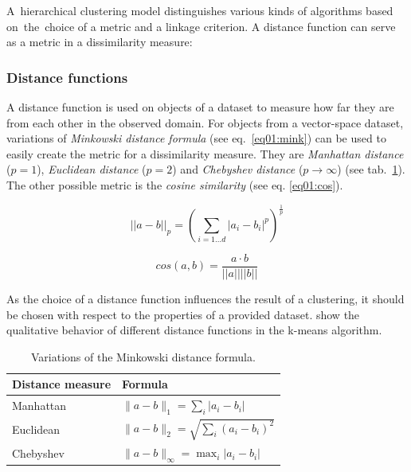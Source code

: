 A~hierarchical clustering model distinguishes various kinds of algorithms based on~the~choice of a metric and a linkage criterion. A distance function can serve as a metric in a dissimilarity measure:

\subsubsection{Distance functions}

A distance function is used on objects of a dataset to measure how far they are from each other in the observed domain. For objects from a vector-space dataset, variations of \emph{Minkowski distance formula} (see eq.~\ref{eq01:mink}) can be used to easily create the metric for a dissimilarity measure.
They are \emph{Manhattan distance} ($p=1$), \emph{Euclidean distance} ($p=2$) and \emph{Chebyshev distance} ($p \to \infty$) (see tab.~\ref{tab01:mink}). The other possible metric is the \emph{cosine similarity} (see eq. \ref{eq01:cos}).

\begin{equation}\label{eq01:mink}
||a-b||_p = (\sum_{i=1...d}|a_i-b_i|^p)^{\frac{1}{p}}
\end{equation}

\begin{equation}\label{eq01:cos}
cos(a,b) = \dfrac{a\cdot b}{||a||||b||}
\end{equation}

As the choice of a distance function influences the result of a clustering, it should be chosen with respect to the properties of a provided dataset. \citet{aggarwal2001surprising} show the qualitative behavior of different distance functions in the k-means algorithm.



\begin{table}[t]
	\centering
	\renewcommand{\arraystretch}{1.3}
	\begin{tabular}{ll}
		\toprule
		Distance measure & Formula \\
		\midrule
		Manhattan & $\|a-b\|_1 = \sum_{i}|a_i-b_i|$          \\
		Euclidean & $\|a-b\|_2 = \sqrt{\sum_{i}(a_i-b_i)^2}$ \\
		Chebyshev & $\|a-b\|_\infty = \max_{i}|a_i-b_i|$  \\
		\bottomrule
	\end{tabular}
	\caption{Variations of the Minkowski distance formula.}
	\label{tab01:mink}
\end{table}

